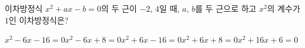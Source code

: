이차방정식 $x^2+ax-b=0$의 두 근이 $-2$, $4$일 때, $a$, $b$를 두 근으로 하고 $x^2$의 계수가 $1$인 이차방정식은? 
\begin{choicesii}{$x^2-6x-16=0$}{$x^2-6x+8=0$}{$x^2+6x-16=0$}{$x^2+6x+8=0$}{$x^2+16x+6=0$}\end{choicesii}
